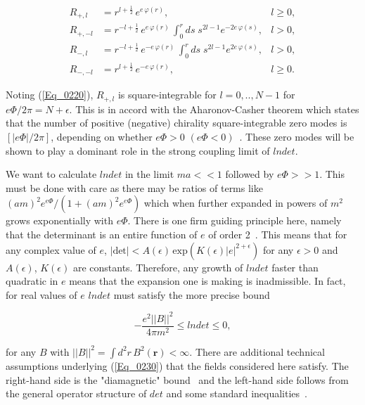 \documentclass[a4paper,twocolumn,showpacs,preprintnumbers,amsmath,amssymb]{revtex4}
\newcommand{\half}{\frac{1}{2}}
\newcommand{\gap}{\vspace{3mm}}
\begin{document}
\begin{equation}
\begin{array}{llr}
\label{Eq_0229}
R_{+,l} &= r^{l + \half} \, e^{e \, \varphi(r)},& l \geq 0,\\[3mm]
\displaystyle
R_{+,-l} &= r^{-l + \half} \, e^{e \, \varphi(r)} \,
  \displaystyle
  \int^r_0 ds \; s^{2l-1} e^{-2e \, \varphi(s)},& l > 0,\\[3mm]
R_{-,l} &= r^{-l + \half} \, e^{-e \, \varphi(r)} \,
  \displaystyle
  \int^r_0 ds \; s^{2l-1} e^{2e \, \varphi(s)},& l > 0,\\[3mm]
R_{-,-l} &= r^{l + \half} \,  e^{-e \, \varphi(r)},& l \geq 0.
\end{array}
\end{equation}

\gap
\noindent
Noting (\ref{Eq_0220}), $R_{+,l}$ is square-integrable for
$l = 0, .., N-1$ for $e\Phi/2\pi = N + \epsilon$. This is in accord
with the Aharonov-Casher theorem which states that the number of
positive (negative) chirality square-integrable zero modes is
$[|e\Phi|/2\pi]$, depending on whether $e\Phi > 0$
$(e\Phi < 0)$~\cite{Aharonov79}. These zero modes will be shown to
play a dominant role in the strong coupling limit of $lndet$.

We want to calculate $lndet$ in the limit $ma<<1$ followed by
$e\Phi >> 1$. This must be done with care as there may be ratios of
terms like $(am)^2 e^{e\Phi} /(1 + (am)^2 e^{e\Phi})$ which when
further expanded in powers of $m^2$ grows exponentially with
$e\Phi$. There is one firm guiding principle here, namely that the
determinant is an entire function of $e$ of order
2~\cite{Seiler75,Seiler82}. This means that for any complex value of $e$,
$|\text{det}| < A(\epsilon) \, \text{exp}\left(K(\epsilon)|e|^{2 + \epsilon}\right)$
for any $\epsilon > 0$ and $A(\epsilon)$, $K(\epsilon)$ are
constants. Therefore, any growth of $lndet$ faster than quadratic in
$e$ means that the expansion one is making is inadmissible. In fact,
for real values of $e$ $lndet$ must satisfy the more precise bound

\begin{equation}
\label{Eq_0230}
-\frac{e^2||B||^2}{4\pi m^2} \leq lndet \leq 0,
\end{equation}

\noindent
for any $B$ with $||B||^2 = \int d^2r \, B^2(\mathbf{r}) < \infty$.
There are additional technical assumptions underlying
(\ref{Eq_0230}) that the fields considered here satisfy.
The right-hand side is the "diamagnetic"
bound~\cite{Seiler81,Seiler82,Brydges79,Weingarten80} and the
left-hand side follows from the general operator structure of $det$
and some standard inequalities~\cite{Fry02}.
\end{document}
